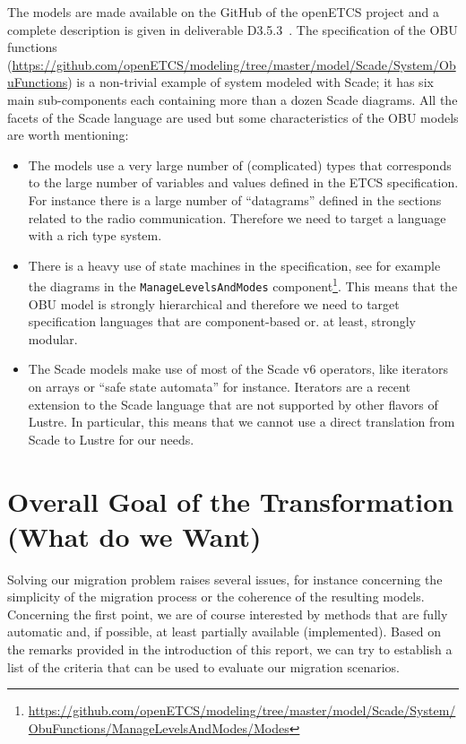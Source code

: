 \documentclass{template/openetcs_report}
\begin{document}
The models are made available on the GitHub of the openETCS project
and a complete description is given in deliverable D3.5.3~\cite{d353}.
The specification of the OBU functions
(\url{https://github.com/openETCS/modeling/tree/master/model/Scade/System/ObuFunctions})
is a non-trivial example of system modeled with Scade; it has six main
sub-components each containing more than a dozen Scade diagrams. All
the facets of the Scade language are used but some characteristics of
the OBU models are worth mentioning:
\begin{itemize}
\item The models use a very large number of (complicated) types that
  corresponds to the large number of variables and values defined in
  the ETCS specification. For instance there is a large number of
  ``datagrams'' defined in the sections related to the radio
  communication. Therefore we need to target a language with a rich
  type system.

\item There is a heavy use of state machines in the specification, see
  for example the diagrams in the {\verb+ManageLevelsAndModes+}
  component\footnote{\url{https://github.com/openETCS/modeling/tree/master/model/Scade/System/ObuFunctions/ManageLevelsAndModes/Modes}}. This
  means that the OBU model is strongly hierarchical and therefore we
  need to target specification languages that are component-based
  or. at least, strongly modular.

\item The Scade models make use of most of the Scade v6 operators,
  like iterators on arrays or ``safe state automata'' for
  instance. Iterators are a recent extension to the Scade language
  that are not supported by other flavors of Lustre. In particular,
  this means that we cannot use a direct translation from Scade to
  Lustre for our needs.
\end{itemize}

\chapter{Overall Goal of the Transformation (What do we Want)}
\label{cha:over-goal-transf}


Solving our migration problem raises several issues, for instance
concerning the simplicity of the migration process or the coherence of
the resulting models. Concerning the first point, we are of course
interested by methods that are fully automatic and, if possible, at
least partially available (implemented). Based on the remarks provided
in the introduction of this report, we can try to establish a list of
the criteria that can be used to evaluate our migration scenarios.
\end{document}
